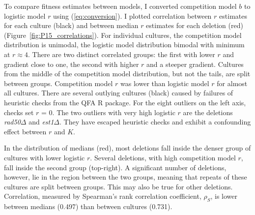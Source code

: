 \begin{multicols}{2}
To compare fitness estimates between models, I converted competition
model \(b\) to logistic model \(r\) using (\ref{eq:conversion}).
I plotted correlation between \(r\) estimates for each culture (black)
and between median \(r\) estimates for each deletion (red)
(Figure~\ref{fig:P15_correlations}).
For individual cultures, the competition model distribution is
unimodal, the logistic model distribution bimodal with minimum at
\(r \approx 4\). There are two distinct correlated groups: the first
with lower \(r\) and gradient close to one, the second with higher
\(r\) and a steeper gradient. Cultures from the middle of the
competition model distribution, but not the tails, are split between
groups. Competition model \(r\) was lower than logistic model \(r\)
for almost all cultures. There are several outlying cultures (black)
caused by failures of heuristic checks from the QFA R package. For the
eight outliers on the left axis, checks set \(r\) = 0. The two
outliers with very high logistic \(r\) are the deletions
\textit{rad50\(\Delta\)} and \textit{est1\(\Delta\)}. They have
escaped heuristic checks and exhibit a confounding effect between
\(r\) and \(K\).

In the distribution of medians (red), most deletions fall inside the
denser group of cultures with lower logistic \(r\). Several deletions,
with high competition model \(r\), fall inside the second group
(top-right). A significant number of deletions, however, lie in the
region between the two groups, meaning that repeats of these cultures
are split between groups. This may also be true for other
deletions. Correlation, measured by Spearman's rank correlation
coefficient, \(\rho_{S}\), is lower between medians (0.497) than
between cultures (0.731).


\end{multicols}
